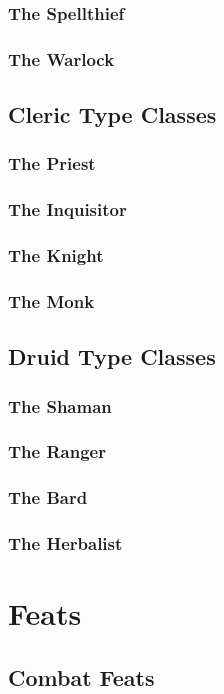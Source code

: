 \documentclass[openany,10pt,a4paper]{book}
\begin{document}
\subsection{The Spellthief}
\subsection{The Warlock}
\section{Cleric Type Classes}
\subsection{The Priest}
\subsection{The Inquisitor}
\subsection{The Knight}
\subsection{The Monk}
\section{Druid Type Classes}
\subsection{The Shaman}
\subsection{The Ranger}
\subsection{The Bard}
\subsection{The Herbalist}
\chapter{Feats}
\section{Combat Feats}
\end{document}
